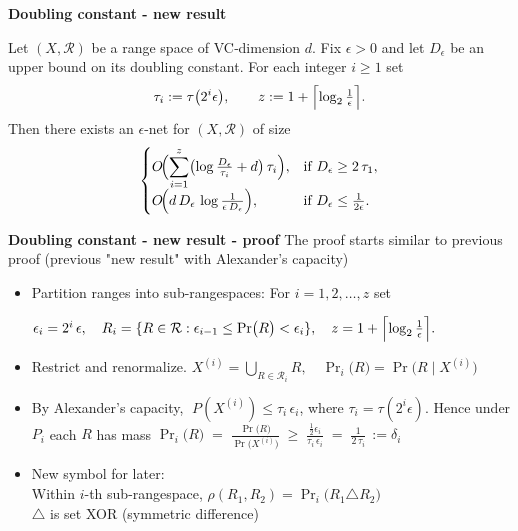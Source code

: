 \documentclass{beamer}
\begin{document}
\begin{frame}{\textbf{Doubling constant - new result}}
\begin{theorem}[]
Let \((X,\mathcal R)\) be a range space of VC‐dimension \(d\).  Fix \(\epsilon>0\) and let \(D_{\epsilon}\) be an upper bound on its doubling constant.  For each integer \(i\ge1\) set
\[
  \tau_i := \tau\bigl(2^i\epsilon\bigr),
  \qquad
  z := 1 + \Bigl\lceil \log_2 \tfrac1\epsilon\Bigr\rceil.
\]
Then there exists an \(\epsilon\)-net for \((X,\mathcal R)\) of size
\[
\begin{cases}
  O\!\displaystyle\Bigl(\sum_{i=1}^{z}
      \bigl(\log\tfrac{D_{\epsilon}}{\tau_i} + d\bigr)\,\tau_i\Bigr),
    &\text{if }D_{\epsilon}\ge2\,\tau_1,\\[1ex]
  O\!\displaystyle\Bigl(d\,D_{\epsilon}\,\log\tfrac1{\epsilon\,D_{\epsilon}}\Bigr),
    &\text{if }D_{\epsilon}\le\tfrac1{2\epsilon}.
\end{cases}
\]
\end{theorem}

\end{frame}

\begin{frame}{\textbf{Doubling constant - new result - proof}}
    The proof starts similar to previous proof (previous "new result" with Alexander's capacity)
    \vspace{0.3cm}
    \begin{itemize}
        \item  Partition ranges into sub-rangespaces:
   For $i=1,2,\dots,z$ set

   \(
     \epsilon_i = 2^i\,\epsilon,
     \quad
     R_i = \{ R \in \mathcal{R} : \epsilon_{i-1}\le \Pr \bigl (R \bigr )<\epsilon_i\},
     \quad
     z = 1+\Bigl\lceil\log_2\frac1\epsilon\Bigr\rceil.
   \)
    \vspace{0.3cm}
   \item Restrict and renormalize.
   \(
     X^{(i)}=\bigcup_{R\in \mathcal{R}_i}R,
     \quad
     \Pr_i \bigl( R \bigr )= \Pr \bigl( R  \mid X^{(i)} \bigr)
   \)
   \vspace{0.3cm}
   \item  By Alexander’s capacity,
   $\;P(X^{(i)})\le\tau_i\,\epsilon_i$, where $\tau_i=\tau(2^i\epsilon)$.
   Hence under $P_i$ each $R$ has mass
    \(
     \Pr_i \bigl (R \bigr )\;=\;\frac{\Pr \bigl(R \bigr)}{\Pr \bigl(X^{(i)} \bigr )}
     \;\ge\;
     \frac{\tfrac12\epsilon_i}{\tau_i\,\epsilon_i}
     \;=\;
     \frac1{2\,\tau_i}\, := \delta_i
   \)
   \vspace{0.3cm}
   \item New symbol for later:\\Within $i$-th sub-rangespace, \(\rho(R_1,R_2) = \Pr_i \bigl(R_1 \triangle R_2\bigr)\)
   \\ \( \triangle \) is set XOR (symmetric difference)
    \end{itemize}
\end{frame}
\end{document}
